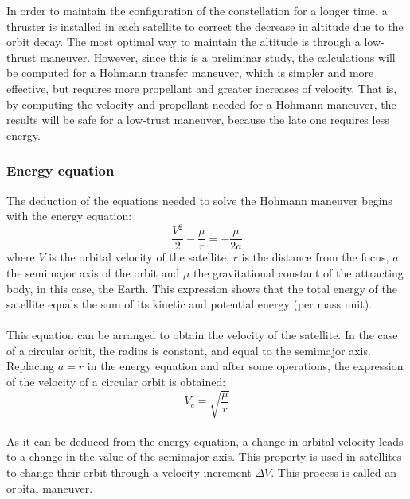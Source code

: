 In order to maintain the configuration of the constellation for a longer time, a thruster is installed in each satellite to correct the decrease in altitude due to the orbit decay. The most optimal way to maintain the altitude is through a low-thrust maneuver. However, since this is a preliminar study, the calculations will be computed for a Hohmann transfer maneuver, which is simpler and more effective, but requires more propellant and greater increases of velocity. That is, by computing the velocity and propellant needed for a Hohmann maneuver, the results will be safe for a low-trust maneuver, because the late one requires less energy.

\subsubsection{Energy equation}
The deduction of the equations needed to solve the Hohmann maneuver begins with the energy equation:
\begin{equation}
\frac{V^2}{2}-\frac{\mu}{r}=-\frac{\mu}{2a}
\end{equation}
where $V$ is the orbital velocity of the satellite, $r$ is the distance from the focus, $a$ the semimajor axis of the orbit and $\mu$ the gravitational constant of the attracting body, in this case, the Earth. This expression shows that the total energy of the satellite equals the sum of its kinetic  and potential energy (per mass unit).
\paragraph{}
This equation can be arranged to obtain the velocity of the satellite. In the case of a circular orbit, the radius is constant, and equal to the semimajor axis. Replacing $a=r$ in the energy equation and after some operations, the expression of the velocity of a circular orbit is obtained:
\begin{equation}
V_{c}=\sqrt{\frac{\mu}{r}}
\end{equation}
\paragraph{}
As it can be deduced from the energy equation, a change in orbital velocity leads to a change in the value of the semimajor axis. This property is used in satellites to change their orbit through a velocity increment $\Delta V$. This process is called an orbital maneuver.

